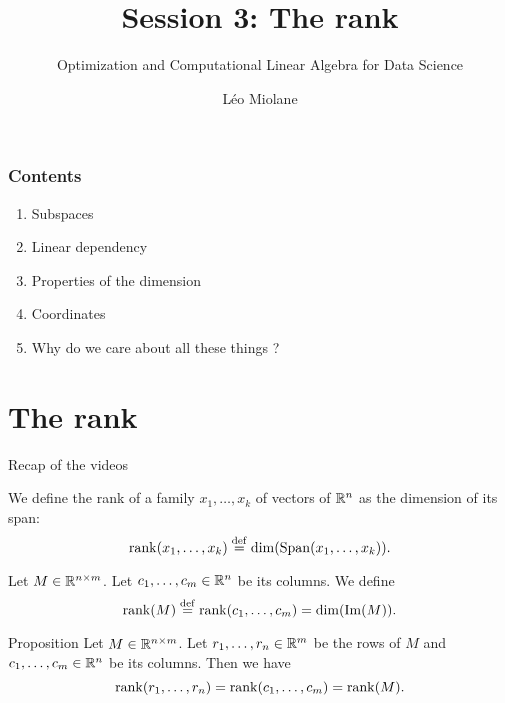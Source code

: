 \documentclass{beamer}
\title{Session 3: The rank}
\subtitle{Optimization and Computational Linear Algebra for Data Science}
\author{Léo Miolane}
\date{}
\begin{document}
\setcounter{showProgressBar}{0}
\setcounter{showSlideNumbers}{0}

\frame{\titlepage}

\begin{frame}
	\frametitle{Contents}
	\begin{enumerate}
		\item Subspaces
		\item Linear dependency
		\item Properties of the dimension
		\item Coordinates
		\item Why do we care about all these things ? 
	\end{enumerate}
\end{frame}


\setcounter{framenumber}{0}
\setcounter{showSlideNumbers}{1}

\section{The rank}

\begin{frame}[t]{Recap of the videos}
	\vspace{-0.4cm}
	\begin{definition}
		We define the rank of a family $x_1, \dots, x_k$ of vectors of $\mathbb{R}^n$ as the dimension of its span:
		\vspace{-0.3cm}
		$$
		\rank(x_1, \dots, x_k) \defeq \dim (\Span(x_1, \dots, x_k)).
		\vspace{-0.3cm}
		$$
	\end{definition}
	\begin{definition}
		Let $M \in \mathbb{R}^{n \times m}$. Let $c_1, \dots, c_m \in \mathbb{R}^n$ be its columns.
		We define
		\vspace{-0.3cm}
		$$
		\rank(M) \defeq \rank(c_1, \dots, c_m) = \dim(\Im(M)).
		\vspace{-0.3cm}
		$$
	\end{definition}
	\begin{block}{Proposition}
		Let $M \in \mathbb{R}^{n \times m}$. Let $r_1, \dots, r_n \in \mathbb{R}^m$ be the rows of $M$ and $c_1, \dots, c_m \in \mathbb{R}^n$ be its columns.
		Then we have
		\vspace{-0.3cm}
		$$
		\rank(r_1, \dots, r_n) = \rank(c_1, \dots, c_m) = \rank(M).
		\vspace{-0.3cm}
		$$
	\end{block}
\end{frame}
\end{document}
